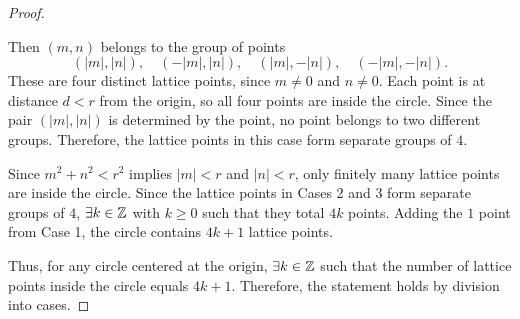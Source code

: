 \begin{proof}
{    \begin{panel}{
        Then $(m, n)$ belongs to the group of points %
        \[
            (|m|, |n|), \quad (-|m|, |n|), \quad
            (|m|, -|n|), \quad (-|m|, -|n|).
        \]
        These are four distinct lattice points, since $m \neq 0$ and %
        $n \neq 0$. %
        Each point is at distance $d < r$ from the origin, %
        so all four points are inside the circle. %
        Since the pair $(|m|, |n|)$ is determined by the point, %
        no point belongs to two different groups. %
        Therefore, the lattice points in this case form separate groups %
        of $4$.
    }
    \end{panel}

    \begin{panel}{
        Since $m^2 + n^2 < r^2$ implies $|m| < r$ and $|n| < r$, %
        only finitely many lattice points are inside the circle. %
        Since the lattice points in Cases 2 and 3 form separate groups %
        of $4$, $\exists k \in \mathbb{Z}$ with $k \ge 0$ such that they total %
        $4k$ points. %
        Adding the $1$ point from Case 1, %
        the circle contains $4k + 1$ lattice points.
    }
    \end{panel}

    Thus, for any circle centered at the origin, $\exists k \in \mathbb{Z}$ such that %
    the number of lattice points inside the circle equals $4k + 1$. %
    Therefore, the statement holds by division into cases.
}
\end{proof}